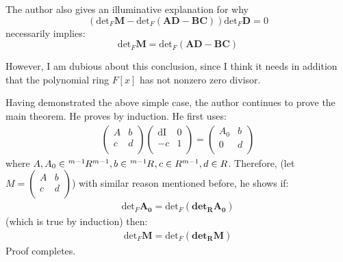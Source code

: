\documentclass{article}
\numberwithin{equation}{subsection} %
\theoremstyle{definition}
\begin{document}
        The author also gives an illuminative explanation for why
        $$ \left( \text{det}_F \mathbf{M}- \text{det}_F (\mathbf{AD-BC}) 
            \right) \text{det}_F \mathbf{D} =0 $$
        necessarily implies:
        $$ \text{det}_F \mathbf{M}= \text{det}_F (\mathbf{AD-BC}) $$
       
        However, I am dubious about this conclusion, since I think it
        needs in addition that the polynomial ring $F[x]$ has not
        nonzero zero divisor.

        Having demonstrated the above simple case, the author continues to
        prove the main theorem. He proves by induction. He first uses:
        \begin{align}
            \left(
                \begin{array}{cc}
                 A & b \\
                 c & d \\
                \end{array}
            \right)  \left(
                \begin{array}{cc}
                 \text{dI} & 0 \\
                 -c & 1 \\
                \end{array}
            \right)=\left(
                \begin{array}{cc}
                 A_0 & b \\
                 0 & d \\
                \end{array}
            \right)
        \end{align}
        where $A,A_0\in \tensor[^{m-1}]{R}{^{m-1}}, 
        b\in \tensor[^{m-1}]{R}{}, c\in \tensor{R}{^{m-1}}, d\in R$. 
        Therefore, (let $M=
            \left(
            \begin{array}{cc}
             A & b \\
             c & d \\
            \end{array}
            \right)$)
        with similar reason mentioned before, he shows if:
        \begin{align}
            \text{det}_F \mathbf{A_0} =
              \text{det}_F \mathbf{( \text{det}_R \mathbf{A_0})}
        \end{align}
        (which is true by induction) then:
        \begin{align}
            \text{det}_F \mathbf{M} =
              \text{det}_F \mathbf{( \text{det}_R \mathbf{M})}
        \end{align}
        Proof completes.
\end{document}
